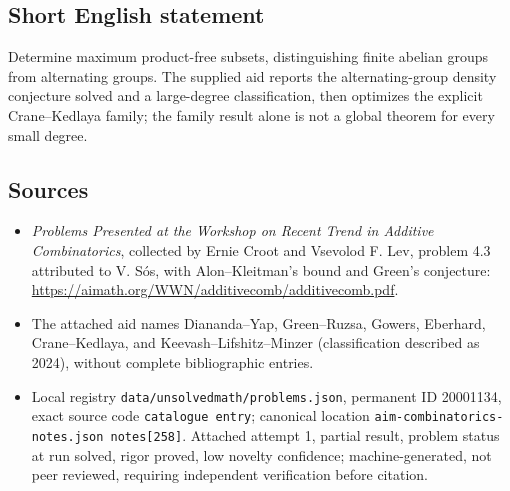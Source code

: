 \documentclass[11pt]{article}
\begin{document}
\subsection{Short English statement}
Determine maximum product-free subsets, distinguishing finite abelian groups from alternating groups. The supplied aid reports the alternating-group density conjecture solved and a large-degree classification, then optimizes the explicit Crane--Kedlaya family; the family result alone is not a global theorem for every small degree.
\subsection{Sources}
\begin{itemize}
\item \emph{Problems Presented at the Workshop on Recent Trend in Additive Combinatorics}, collected by Ernie Croot and Vsevolod F. Lev, problem 4.3 attributed to V. S\'os, with Alon--Kleitman's bound and Green's conjecture: \url{https://aimath.org/WWN/additivecomb/additivecomb.pdf}.
\item The attached aid names Diananda--Yap, Green--Ruzsa, Gowers, Eberhard, Crane--Kedlaya, and Keevash--Lifshitz--Minzer (classification described as 2024), without complete bibliographic entries.
\item Local registry \texttt{data/unsolvedmath/problems.json}, permanent ID 20001134, exact source code \texttt{catalogue entry}; canonical location \texttt{aim-combinatorics-notes.json notes[258]}. Attached attempt 1, partial result, problem status at run solved, rigor proved, low novelty confidence; machine-generated, not peer reviewed, requiring independent verification before citation.
\end{itemize}
\end{document}
